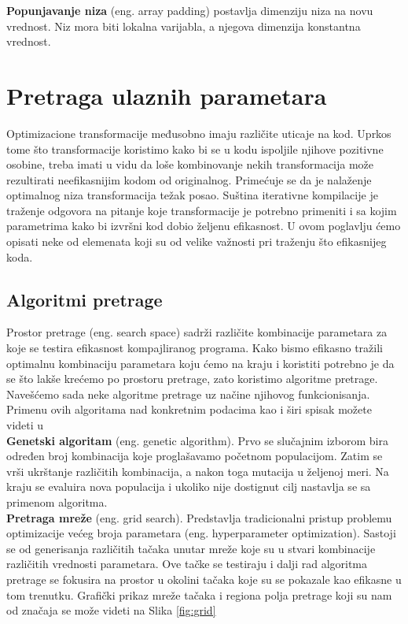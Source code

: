 \documentclass[a4paper]{article}
\begin{document}
\textbf{Popunjavanje niza} (eng. array padding) postavlja dimenziju niza na novu vrednost. Niz mora biti lokalna varijabla, a njegova dimenzija konstantna vrednost.

\section{Pretraga ulaznih parametara}
\label{sec:pretraga}
Optimizacione transformacije međusobno imaju različite uticaje na kod. Uprkos tome što transformacije koristimo kako bi se u kodu ispoljile njihove pozitivne osobine, treba imati u vidu da loše kombinovanje nekih transformacija može rezultirati neefikasnijim kodom od originalnog. \cite{kisuki2000iterative} Primećuje se da je
nalaženje optimalnog niza transformacija težak posao. \cite{Fursin2005} Suština iterativne kompilacije
je traženje odgovora na pitanje koje transformacije je potrebno primeniti i sa kojim parametrima kako bi izvršni kod dobio željenu efikasnost. U ovom poglavlju ćemo opisati neke od elemenata koji su od velike važnosti pri traženju što efikasnijeg koda.
\subsection{Algoritmi pretrage}
\label{sec:pretrage}

Prostor pretrage (eng. search space) sadrži različite kombinacije parametara za koje se testira efikasnost kompajliranog programa. Kako bismo efikasno tražili optimalnu kombinaciju parametara koju ćemo na kraju i koristiti potrebno je da se što lakše krećemo po prostoru pretrage, zato koristimo algoritme pretrage. Navešćemo sada neke algoritme pretrage uz načine njihovog funkcionisanja. Primenu ovih algoritama nad konkretnim podacima kao i širi spisak možete videti u \cite{kisuki2000iterative} \\

\textbf{Genetski algoritam} (eng. genetic algorithm). Prvo se slučajnim izborom bira određen broj kombinacija koje proglašavamo početnom populacijom. Zatim se vrši ukrštanje različitih kombinacija, a nakon toga mutacija u željenoj meri. Na kraju se evaluira nova populacija i ukoliko nije dostignut cilj nastavlja se sa primenom algoritma.\\

\textbf{Pretraga mreže} (eng. grid search). Predstavlja tradicionalni pristup problemu optimizacije većeg broja parametara (eng. hyperparameter optimization). Sastoji se od generisanja različitih tačaka unutar mreže koje su u stvari kombinacije različitih vrednosti parametara. Ove tačke se testiraju i dalji rad algoritma pretrage se fokusira na prostor u okolini tačaka koje su se pokazale kao efikasne u tom trenutku. Grafički prikaz mreže tačaka i regiona polja pretrage koji su nam od značaja se može videti na Slika \ref{fig:grid} \\
\end{document}
